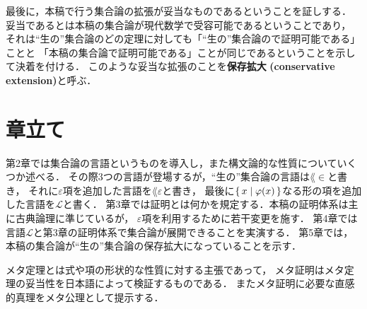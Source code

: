 	最後に，本稿で行う集合論の拡張が妥当なものであるということを証しする．
	妥当であるとは本稿の集合論が現代数学で受容可能であるということであり，
	それは``生の''集合論のどの定理に対しても「``生の''集合論ので証明可能である」ことと
	「本稿の集合論で証明可能である」ことが同じであるということを示して決着を付ける．
	このような妥当な拡張のことを{\bf 保存拡大}
	{\bf (conservative extension)}と呼ぶ．
	
\section{章立て}
	第2章では集合論の言語というものを導入し，また構文論的な性質についていくつか述べる．
	その際3つの言語が登場するが，``生の''集合論の言語は$\lang{\in}$と書き，
	それに$\varepsilon$項を追加した言語を$\lang{\varepsilon}$と書き，
	最後に$\{\, x \mid \varphi(x)\, \}$なる形の項を追加した言語を$\mathcal{L}$と書く．
	第3章では証明とは何かを規定する．本稿の証明体系は主に古典論理に準じているが，
	$\varepsilon$項を利用するために若干変更を施す．
	第4章では言語$\mathcal{L}$と第3章の証明体系で集合論が展開できることを実演する．
	第5章では，本稿の集合論が``生の''集合論の保存拡大になっていることを示す．
	
	メタ定理とは式や項の形状的な性質に対する主張であって，
	メタ証明はメタ定理の妥当性を日本語によって検証するものである．
	またメタ証明に必要な直感的真理をメタ公理として提示する．
	
